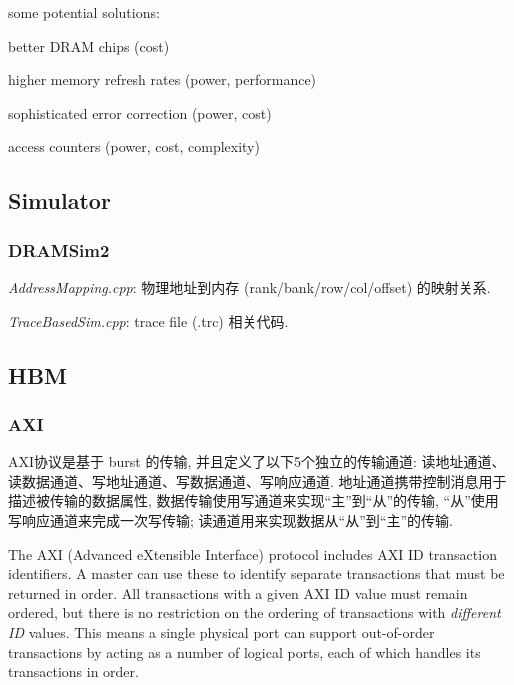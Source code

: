\documentclass[UTF8,12pt,a4paper]{article}
\begin{document}
some potential solutions:
\begin{compactitem}
  \item better DRAM chips (cost)
  \item higher memory refresh rates (power, performance)
  \item sophisticated error correction (power, cost)
  \item access counters (power, cost, complexity)
\end{compactitem}



\subsection{Simulator}
\subsubsection{DRAMSim2}
\begin{compactitem}
  \item \textit{AddressMapping.cpp}: 物理地址到内存 (rank/bank/row/col/offset) 的映射关系.
  \item \textit{TraceBasedSim.cpp}: trace file (.trc) 相关代码.
\end{compactitem}

\subsection{HBM}
\label{sub:HBM}
\subsubsection{AXI}
AXI协议是基于 burst 的传输,
并且定义了以下5个独立的传输通道:
读地址通道、读数据通道、写地址通道、写数据通道、写响应通道.
地址通道携带控制消息用于描述被传输的数据属性,
数据传输使用写通道来实现``主''到``从''的传输,
``从''使用写响应通道来完成一次写传输;
读通道用来实现数据从``从''到``主''的传输.

The AXI (Advanced eXtensible Interface) protocol
includes AXI ID transaction identifiers.
A master can use these to identify separate transactions that must be returned in order.
All transactions with a given AXI ID value must remain ordered,
but there is no restriction on the ordering of transactions with \textit{different ID} values.
This means a single physical port can support out-of-order transactions
by acting as a number of logical ports,
each of which handles its transactions in order.

\clearpage
\end{document}
